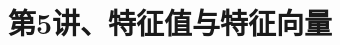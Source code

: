\documentclass[10pt,a4paper%
tablecaptionabove]{article}
\begin{document}
\begin{CJK}{UTF8}{gkai}
  \pagestyle{plain}
  
  \renewcommand{\proofname}{\textbf{证明}}
  \renewcommand{\figurename}{\textbf{图}}

  

  \title{第5讲、特征值与特征向量}
  \maketitle


  
  
  


\end{CJK}
\end{document}
